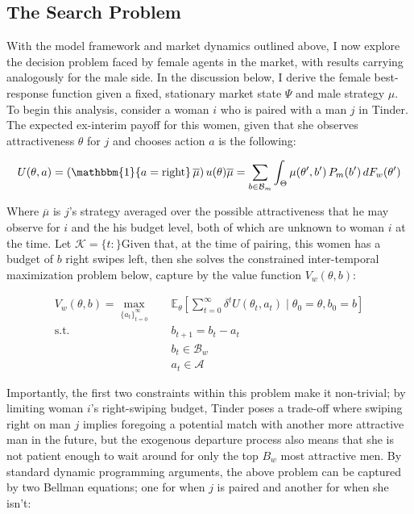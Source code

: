 \subsection{The Search Problem}
With the model framework and market dynamics outlined above, I now explore the decision problem faced by female agents in the market, with results carrying analogously for the male side. In the discussion below, I derive the female best-response function given a fixed, stationary market state $\Psi$ and male strategy $\mu$. To begin this analysis, consider a woman $i$ who is paired with a man $j$ in Tinder. The expected ex-interim payoff for this women, given that she observes attractiveness $\theta$ for $j$ and chooses action $a$ is the following:

\begin{equation*}
    U(\theta, a)=(\mathbbm{1}\{a=\text{right}\}\,\overline{\mu})\,u(\theta) \\
    \overline{\mu} = \sum_{b\in \mathcal{B}_m}\int_{\Theta} \mu(\theta',b')\,{P}_m(b')\,dF_w(\theta')
\end{equation*}

Where $\overline\mu$ is $j$'s strategy averaged over the possible attractiveness that he may observe for $i$ and the his budget level, both of which are unknown to woman $i$ at the time. Let $\mathcal{K}=\{t : \}$Given that, at the time of pairing, this women has a budget of $b$ right swipes left, then she solves the constrained inter-temporal maximization problem below, capture by the value function $V_w(\theta,b)$:

\begin{equation}
    \begin{aligned} 
        V_w(\theta,b)=\max_{\{a_t\}^\infty_{t=0}} \quad & \mathbb{E}_{\theta}\left[\sum^\infty_{t=0} \delta^{t} U(\theta_t, a_t) \;|\; \theta_0=\theta, b_0=b\right]\\ 
        \textrm{s.t.} \quad & b_{t+1}  = b_t -a_t \\
        & b_t\in \mathcal{B}_w \\
        & a_t\in \mathcal{A}  
    \end{aligned}
\end{equation}

Importantly, the first two constraints within this problem make it non-trivial; by limiting woman $i$'s right-swiping budget, Tinder poses a trade-off where swiping right on man $j$ implies foregoing a potential match with another more attractive man in the future, but the exogenous departure process also means that she is not patient enough to wait around for only the top $B_w$ most attractive men. By standard dynamic programming arguments, the above problem can be captured by two Bellman equations; one for when $j$ is paired and another for when she isn't:

